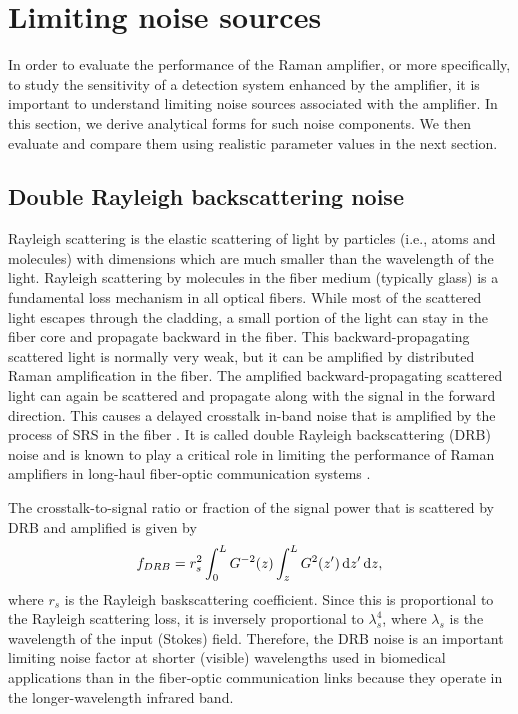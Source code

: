 \section{Limiting noise sources} \label{sec:JOSAA2013_Section3}

In order to evaluate the performance of the Raman amplifier, or more specifically, to study the sensitivity of a detection system enhanced by the amplifier, it is important to understand limiting noise sources associated with the amplifier. In this section, we derive analytical forms for such noise components. We then evaluate and compare them using realistic parameter values in the next section.

\subsection{Double Rayleigh backscattering noise}

Rayleigh scattering is the elastic scattering of light by particles (i.e., atoms and molecules) with dimensions which are much smaller than the wavelength of the light. Rayleigh scattering by molecules in the fiber medium (typically glass) is a fundamental loss mechanism in all optical fibers. While most of the scattered light escapes through the cladding, a small portion of the light can stay in the fiber core and propagate backward in the fiber. This backward-propagating scattered light is normally very weak, but it can be amplified by distributed Raman amplification in the fiber. The amplified backward-propagating scattered light can again be scattered and propagate along with the signal in the forward direction. This causes a delayed crosstalk in-band noise that is amplified by the process of SRS in the fiber \cite{agrawal1997fiber,kim2002reflection}. It is called double Rayleigh backscattering (DRB) noise \cite{islam2004raman,lewis2000characterization} and is known to play a critical role in limiting the performance of Raman amplifiers in long-haul fiber-optic communication systems \cite{hansen1998rayleigh}.

The crosstalk-to-signal ratio or fraction of the signal power that is scattered by DRB and amplified is given by \cite{nissov1999rayleigh}
\begin{equation}
f_{DRB} = r_s^2 \int_0^L G^{-2}(z) \int_z^L{G^2(z') \,\mathrm{d} z'} \,\mathrm{d} z,\label{eqn:JOSAA_Equation_8}
\end{equation}
where $r_s$ is the Rayleigh baskscattering coefficient. Since this is proportional to the Rayleigh scattering loss, it is inversely proportional to $\lambda_s^4$, where $\lambda_s$ is the wavelength of the input (Stokes) field. Therefore, the DRB noise is an important limiting noise factor at shorter (visible) wavelengths used in biomedical applications than in the fiber-optic communication links because they operate in the longer-wavelength infrared band.

